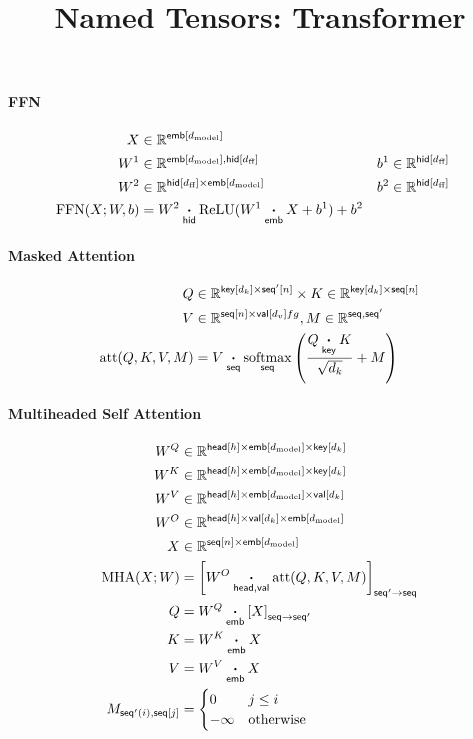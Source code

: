 \documentclass{article}
\title{Named Tensors: Transformer}
\date{}
\newcommand{\reals}[0]{\mathbb{R}}
\newcommand{\dmodel}{d_{\text{model}}}
\newcommand{\dff}{d_{\text{ff}}}
\begin{document}
\maketitle


\paragraph{FFN}
\begin{align*}
X &\in \reals^{\nset{emb}{\dmodel}} \\
W^1 &\in \reals^{\nset{emb}{\dmodel}, \nset{hid}{\dff}} & 
b^1 &\in \reals^{\nset{hid}{\dff}} \\
W^2 & \in \reals^{\nset{hid}{\dff} \times \nset{emb}{\dmodel}} & b^2 &\in \reals^{\nset{hid}{\dff}} \\
\text{FFN}(X; W, b) &=  W^2 \ndot{hid} \text{ReLU}(W^1 \ndot{emb} X + b^1) + b^2
\end{align*}

\paragraph{Masked Attention}
\begin{align*} 
Q &\in \reals^{\nset{key}{d_k} \times \nset{seq'}{n}} \times K \in \reals^{\nset{key}{d_k} \times \nset{seq}{n}}\\
V &\in \reals^{\nset{seq}{n} \times \nset{val}{d_v}fg
},
M \in \reals^{\name{seq}, \name{seq'}}\\
\text{att}(Q, K, V, M) &=  V \ndot{seq} \nfun{seq}{softmax} \left( \frac{\displaystyle Q \ndot{key} K }{\sqrt{d_k}} + M \right) 
\end{align*}

\paragraph{Multiheaded Self Attention}
\begin{align*}
  W^Q &\in \mathbb{R}^{\nset{head}{h} \times \nset{emb}{\dmodel} \times \nset{key}{d_k}} \\
  W^K &\in \mathbb{R}^{\nset{head}{h} \times \nset{emb}{\dmodel} \times \nset{key}{d_k}} \\
  W^V &\in \mathbb{R}^{\nset{head}{h} \times \nset{emb}{\dmodel} \times \nset{val}{d_k}} \\
  W^O &\in \mathbb{R}^{\nset{head}{h} \times \nset{val}{d_k} \times \nset{emb}{\dmodel}} \\
  X &\in \mathbb{R}^{\nset{seq}{n} \times \nset{emb}{\dmodel}} \\
  \text{MHA}(X; W) &= \nmov{seq'}{seq}{W^O \ndot{head,val} \text{att}(Q, K, V, M)} \\
  Q &= W^Q \ndot{emb} \nmov{seq}{seq'}{X} \\
  K &= W^K \ndot{emb} X \\
  V &= W^V \ndot{emb} X \\
  M_{\nidx{seq'}{i}, \nset{seq}{j}} &= \begin{cases} 0 & j\leq i \\ -\infty & \text{otherwise} \end{cases}   
\end{align*}
\end{document}
